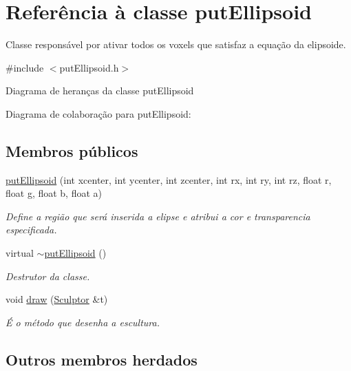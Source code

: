 \hypertarget{classput_ellipsoid}{}\section{Referência à classe put\+Ellipsoid}
\label{classput_ellipsoid}


Classe responsável por ativar todos os voxels que satisfaz a equação da elipsoide.  




{\ttfamily \#include $<$put\+Ellipsoid.\+h$>$}



Diagrama de heranças da classe put\+Ellipsoid


Diagrama de colaboração para put\+Ellipsoid\+:
\subsection*{Membros públicos}
\begin{DoxyCompactItemize}
\item 
\hyperlink{classput_ellipsoid_aefad71d076c5b6fc302a0ca7554a1be4}{put\+Ellipsoid} (int xcenter, int ycenter, int zcenter, int rx, int ry, int rz, float r, float g, float b, float a)
\begin{DoxyCompactList}\small\item\em Define a região que será inserida a elipse e atribui a cor e transparencia especificada. \end{DoxyCompactList}\item 
\mbox{\label{classput_ellipsoid_a114f2480465896dd8167115839f58098}} 
virtual \hyperlink{classput_ellipsoid_a114f2480465896dd8167115839f58098}{$\sim$put\+Ellipsoid} ()
\begin{DoxyCompactList}\small\item\em Destrutor da classe. \end{DoxyCompactList}\item 
void \hyperlink{classput_ellipsoid_a392bfa08917d452add21c19339d15e2c}{draw} (\hyperlink{class_sculptor}{Sculptor} \&t)
\begin{DoxyCompactList}\small\item\em É o método que desenha a escultura. \end{DoxyCompactList}\end{DoxyCompactItemize}
\subsection*{Outros membros herdados}


